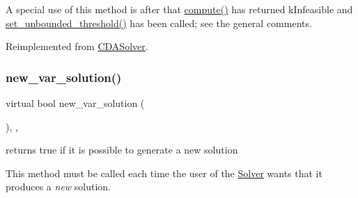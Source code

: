 A special use of this method is after that \mbox{\hyperlink{class_s_m_spp__di__unipi__it_1_1_m_c_f_solver_afc8ff54ab05d22f4cca0fb0bfbeb7a49}{compute()}} has returned k\+Infeasible and \mbox{\hyperlink{class_s_m_spp__di__unipi__it_1_1_solver_ae1717d1363782e086aa797e7437c0352}{set\+\_\+unbounded\+\_\+threshold()}} has been called; see the general comments. 

Reimplemented from \mbox{\hyperlink{class_s_m_spp__di__unipi__it_1_1_c_d_a_solver_a8c650415b6673c33692c363abdfdef00}{C\+D\+A\+Solver}}.

\mbox{\label{class_s_m_spp__di__unipi__it_1_1_m_c_f_solver_a62678dc9f7485d5a2992c588c5dc7d49}} 
\subsubsection{\texorpdfstring{new\+\_\+var\+\_\+solution()}{new\_var\_solution()}}
{\footnotesize\ttfamily virtual bool new\+\_\+var\+\_\+solution (\begin{DoxyParamCaption}\item[{void}]{ }\end{DoxyParamCaption})\hspace{0.3cm}{\ttfamily [inline]}, {\ttfamily [override]}, {\ttfamily [virtual]}}



returns true if it is possible to generate a new solution 

This method must be called each time the user of the \mbox{\hyperlink{class_s_m_spp__di__unipi__it_1_1_solver}{Solver}} wants that it produces a {\itshape new} solution.

